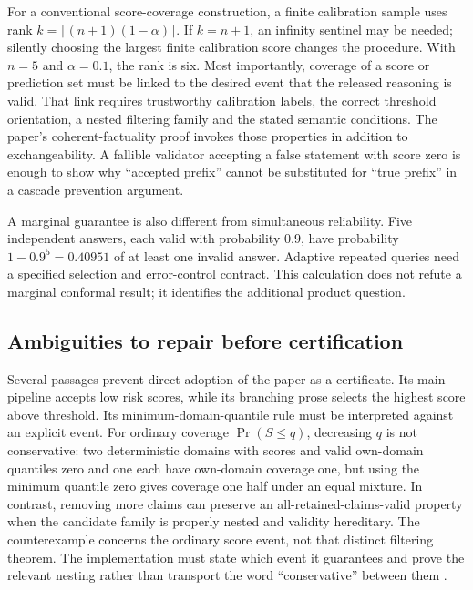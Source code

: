 For a conventional score-coverage construction, a finite calibration sample
uses rank $k=\lceil(n+1)(1-\alpha)\rceil$. If $k=n+1$, an infinity sentinel
may be needed; silently choosing the largest finite calibration score changes
the procedure. With $n=5$ and $\alpha=0.1$, the rank is six. Most importantly,
coverage of a score or prediction set must be linked to the desired event
that the released reasoning is valid. That link requires trustworthy
calibration labels, the correct threshold orientation, a nested filtering
family and the stated semantic conditions. The paper's coherent-factuality
proof invokes those properties in addition to exchangeability. A fallible
validator accepting a false statement with score zero is enough to show why
``accepted prefix'' cannot be substituted for ``true prefix'' in a cascade
prevention argument\citep{exec23_scientific_conformal,exec23_admission_conformal_reference}.

A marginal guarantee is also different from simultaneous reliability. Five
independent answers, each valid with probability $0.9$, have probability
$1-0.9^5=0.40951$ of at least one invalid answer. Adaptive repeated queries
need a specified selection and error-control contract. This calculation
does not refute a marginal conformal result; it identifies the additional
product question\citep{exec23_admission_conformal_reference}.

\subsection{Ambiguities to repair before certification}
\label{exec23:admit-repairs}
Several passages prevent direct adoption of the paper as a certificate. Its
main pipeline accepts low risk scores, while its branching prose selects
the highest score above threshold. Its minimum-domain-quantile rule must be
interpreted against an explicit event. For ordinary coverage
$\Pr(S\leq q)$, decreasing $q$ is not conservative: two deterministic
domains with scores and valid own-domain quantiles zero and one each have
own-domain coverage one, but using the minimum quantile zero gives coverage
one half under an equal mixture. In contrast, removing more claims can
preserve an all-retained-claims-valid property when the candidate family is
properly nested and validity hereditary. The counterexample concerns the
ordinary score event, not that distinct filtering theorem. The implementation
must state which event it guarantees and prove the relevant nesting rather
than transport the word ``conservative'' between them
\citep{exec23_scientific_conformal,exec23_admission_conformal_reference}.

